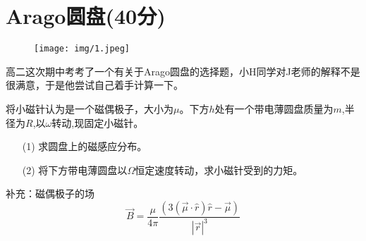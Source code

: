 \documentclass{article}
\begin{document}
\section*{Arago圆盘(40分)}
\begin{wrapfigure}{r}{7cm}
	\vspace{-15pt}    %
	\texttt{[image: img/1.jpeg]}\\
	\vspace{-15pt}    %
	\caption{}
	\vspace{-15pt}    %
\end{wrapfigure}
高二这次期中考考了一个有关于Arago圆盘的选择题，小H同学对J老师的解释不是很满意，于是他尝试自己着手计算一下。\par
将小磁针认为是一个磁偶极子，大小为$\mu$。下方$h$处有一个带电薄圆盘质量为$m$,半径为$R$,以$\omega$转动,现固定小磁针。
\begin{itemize}
    \item[(1)]求圆盘上的磁感应分布。 
    \item[(2)]将下方带电薄圆盘以$\Omega$恒定速度转动，求小磁针受到的力矩。
\end{itemize}
\par
补充：磁偶极子的场
\[
\vec{B}=\dfrac{\mu}{4\pi}\dfrac{(3(\vec{\mu}\cdot\hat{r})\hat{r}-\vec{\mu})}{|\vec{r}|^3}
\]
\end{document}
